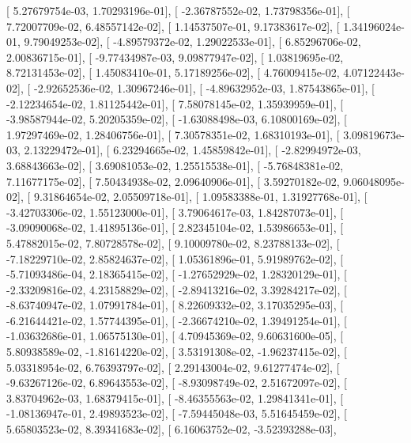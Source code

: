 \documentclass{article}
\begin{document}
       [  5.27679754e-03,   1.70293196e-01],
       [ -2.36787552e-02,   1.73798356e-01],
       [  7.72007709e-02,   6.48557142e-02],
       [  1.14537507e-01,   9.17383617e-02],
       [  1.34196024e-01,   9.79049253e-02],
       [ -4.89579372e-02,   1.29022533e-01],
       [  6.85296706e-02,   2.00836715e-01],
       [ -9.77434987e-03,   9.09877947e-02],
       [  1.03819695e-02,   8.72131453e-02],
       [  1.45083410e-01,   5.17189256e-02],
       [  4.76009415e-02,   4.07122443e-02],
       [ -2.92652536e-02,   1.30967246e-01],
       [ -4.89632952e-03,   1.87543865e-01],
       [ -2.12234654e-02,   1.81125442e-01],
       [  7.58078145e-02,   1.35939959e-01],
       [ -3.98587944e-02,   5.20205359e-02],
       [ -1.63088498e-03,   6.10800169e-02],
       [  1.97297469e-02,   1.28406756e-01],
       [  7.30578351e-02,   1.68310193e-01],
       [  3.09819673e-03,   2.13229472e-01],
       [  6.23294665e-02,   1.45859842e-01],
       [ -2.82994972e-03,   3.68843663e-02],
       [  3.69081053e-02,   1.25515538e-01],
       [ -5.76848381e-02,   7.11677175e-02],
       [  7.50434938e-02,   2.09640906e-01],
       [  3.59270182e-02,   9.06048095e-02],
       [  9.31864654e-02,   2.05509718e-01],
       [  1.09583388e-01,   1.31927768e-01],
       [ -3.42703306e-02,   1.55123000e-01],
       [  3.79064617e-03,   1.84287073e-01],
       [ -3.09090068e-02,   1.41895136e-01],
       [  2.82345104e-02,   1.53986653e-01],
       [  5.47882015e-02,   7.80728578e-02],
       [  9.10009780e-02,   8.23788133e-02],
       [ -7.18229710e-02,   2.85824637e-02],
       [  1.05361896e-01,   5.91989762e-02],
       [ -5.71093486e-04,   2.18365415e-02],
       [ -1.27652929e-02,   1.28320129e-01],
       [ -2.33209816e-02,   4.23158829e-02],
       [ -2.89413216e-02,   3.39284217e-02],
       [ -8.63740947e-02,   1.07991784e-01],
       [  8.22609332e-02,   3.17035295e-03],
       [ -6.21644421e-02,   1.57744395e-01],
       [ -2.36674210e-02,   1.39491254e-01],
       [ -1.03632686e-01,   1.06575130e-01],
       [  4.70945369e-02,   9.60631600e-05],
       [  5.80938589e-02,  -1.81614220e-02],
       [  3.53191308e-02,  -1.96237415e-02],
       [  5.03318954e-02,   6.76393797e-02],
       [  2.29143004e-02,   9.61277474e-02],
       [ -9.63267126e-02,   6.89643553e-02],
       [ -8.93098749e-02,   2.51672097e-02],
       [  3.83704962e-03,   1.68379415e-01],
       [ -8.46355563e-02,   1.29841341e-01],
       [ -1.08136947e-01,   2.49893523e-02],
       [ -7.59445048e-03,   5.51645459e-02],
       [  5.65803523e-02,   8.39341683e-02],
       [  6.16063752e-02,  -3.52393288e-03],
\end{document}
